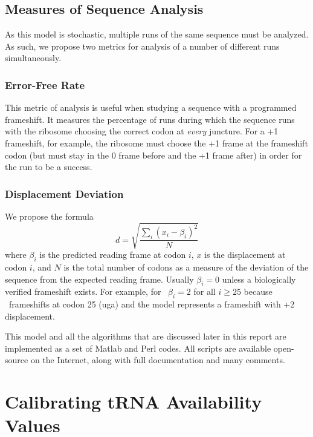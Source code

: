 \documentclass[12pt, draft]{article}
\numberwithin{equation}{section}
\begin{document}

\subsection{Measures of Sequence Analysis}

As this model is stochastic, multiple runs of the same sequence must be analyzed.
As such, we propose two metrics for analysis of a number of different runs 
simultaneously. 

\subsubsection{Error-Free Rate}

This metric of analysis is useful when studying a 
sequence with a programmed frameshift.  It measures the percentage of runs 
during which the sequence runs with the ribosome choosing the correct codon
at \emph{every} juncture.  For a +1 frameshift, for example, the ribosome must
choose the +1 frame at the frameshift codon (but must stay in the 0 frame before
and the +1 frame after) in order for the run to be a success.

\subsubsection{Displacement Deviation}

We propose the formula
\begin{equation}
    \label{eqn:lbd}
    d = \sqrt{\frac{\sum_i \left(x_i - \beta_i\right)^2}{N}}
\end{equation}
where $\beta_i$ is the predicted reading frame at codon $i$, $x$ is the displacement at codon $i$,
and $N$ is the total number of codons as a measure of the deviation of the sequence
from the expected reading frame.  Usually $\beta_i = 0$ unless a biologically verified frameshift exists. 
For example, for \prfB\ $\beta_i = 2$ for all $i \geq 25$ because \prfB\ frameshifts at codon 25 (uga)
and the model represents a frameshift with +2 displacement.

This model and all the algorithms that are discussed later in this report
are implemented as a set of Matlab and Perl codes.  All scripts are available
open-source on the Internet, along with full documentation and many comments.

\section{Calibrating tRNA Availability Values}
\end{document}
